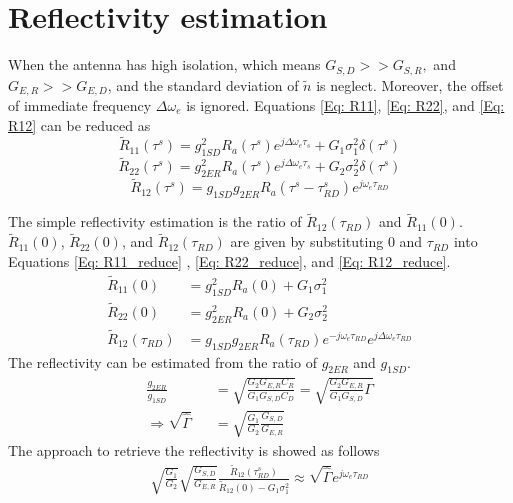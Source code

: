 \documentclass[draftcls,onecolumn]{IEEEtran}  %
\begin{document}
\section{Reflectivity estimation}
When the antenna has high isolation, which means $G_{S,D} >> G_{S,R}, $ and $G_{E,R} >> G_{E,D}$, and the standard deviation of $\tilde{n}$ is neglect. Moreover, the offset of immediate frequency $\Delta\omega_e$ is ignored. Equations \ref{Eq: R11}, \ref{Eq: R22}, and \ref{Eq: R12} can be reduced as
\begin{equation}
	\tilde{R}_{11}(\tau^s) = g^2_{1SD} R_a(\tau^s)e^{j\Delta\omega_e\tau_s}+
G_1\sigma^2_1 \delta(\tau^s)                                      
\label{Eq: R11_reduce}
\end{equation}
\begin{equation}
	\tilde{R}_{22}(\tau^s) = g^2_{2ER} R_a(\tau^s)e^{j\Delta\omega_e\tau_s}+
G_2\sigma^2_2 \delta(\tau^s)                                      
\label{Eq: R22_reduce}
\end{equation}
\begin{equation}
	\tilde{R}_{12}(\tau^s) = g_{1SD} g_{2ER} R_a(\tau^s-\tau^s_{RD})e^{j\omega_e \tau_{RD}}             
\label{Eq: R12_reduce}
\end{equation}

The simple reflectivity estimation is the ratio of $\tilde{R}_{12}(\tau_{RD})$ and $\tilde{R}_{11}(0)$. $\tilde{R}_{11}(0)$, $\tilde{R}_{22}(0)$, and $\tilde{R}_{12}(\tau_{RD})$ are given by substituting $0$ and $\tau_{RD}$ into Equations \ref{Eq: R11_reduce} , \ref{Eq: R22_reduce}, and \ref{Eq: R12_reduce}.
\begin{align}
	\tilde{R}_{11}(0) &= g^2_{1SD} R_a(0)+G_1\sigma^2_1\\ 
    \tilde{R}_{22}(0) &= g^2_{2ER} R_a(0)+G_2\sigma^2_2\\ 
    \tilde{R}_{12}(\tau_{RD}) &= g_{1SD}  g_{2ER}R_a(\tau_{RD})e^{-j\omega_e \tau_{RD}}e^{j\Delta\omega_e\tau_{RD}}
\label{Eq: R11_reduce}
\end{align}The reflectivity can be estimated from the ratio of $g_{2ER}$ and $g_{1SD}$. 
\begin{eqnarray}
	\frac{g_{2ER}}{g_{1SD}} &&= \sqrt{\frac{G_2 G_{E,R} C_R}{G_1 G_{S,D} C_D}}  = \sqrt{ \frac{G_2 G_{E,R}}{G_1 G_{S,D}} \Gamma}  \nonumber \\
    \Rightarrow \sqrt{\hat{\Gamma}} &&= \sqrt{\frac{G_1}{G_2}\frac{G_{S,D}}{G_{E,R}}}
\end{eqnarray}
The approach to retrieve the reflectivity is showed as follows
\begin{eqnarray}
	\sqrt{\frac{G_1}{G_2}}\sqrt{\frac{G_{S,D}}{G_{E,R}}} \frac{\tilde{R}_{12}(\tau^s_{RD})}{\tilde{R}_{12}(0)-G_1\sigma_1^2}\approx\sqrt{\hat{\Gamma}}e^{j\omega_e \tau_{RD}}   
    \label{Eq: Gamma_estimation_approx}
\end{eqnarray}
\end{document}
